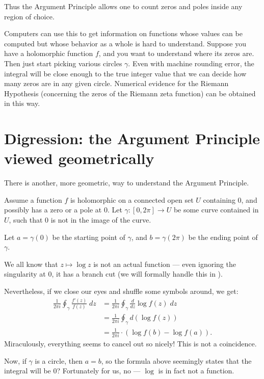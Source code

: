 Thus the Argument Principle allows one to count zeros and poles inside any region of choice.

Computers can use this to get information on functions whose values can be computed but whose behavior as a whole
is hard to understand.
Suppose you have a holomorphic function $f$, and you want to understand where its zeros are.
Then just start picking various circles $\gamma$.
Even with machine rounding error, the integral will be close enough to the true integer value that
we can decide how many zeros are in any given circle.
Numerical evidence for the Riemann Hypothesis (concerning the zeros of the Riemann zeta function)
can be obtained in this way.

\section{Digression: the Argument Principle viewed geometrically}

There is another, more geometric, way to understand the Argument Principle.

Assume a function $f$ is holomorphic on a connected open set $U$ containing $0$,
and possibly has a zero or a
pole at $0$. Let $\gamma \colon [0, 2 \pi] \to U$ be some curve contained in $U$, such that $0$ is
not in the image of the curve.

Let $a = \gamma(0)$ be the starting point of $\gamma$, and $b = \gamma(2 \pi)$ be the ending
point of $\gamma$.

We all know that $z \mapsto \log z$ is not an actual function --- even ignoring the singularity
at $0$, it has a branch cut (we will formally handle this in ).

Nevertheless, if we close our eyes and shuffle some symbols around, we get:
\begin{align*}
	\frac{1}{2 \pi i} \oint_\gamma \frac{f'(z)}{f(z)} \; dz
	&= \frac{1}{2 \pi i} \oint_\gamma \frac{d}{dz} \log f(z) \; dz \\
	&= \frac{1}{2 \pi i} \oint_\gamma d (\log f(z)) \\
	&= \frac{1}{2 \pi i} \cdot (\log f(b) - \log f(a)).
\end{align*}
Miraculously, everything seems to cancel out so nicely! This is not a coincidence.

Now, if $\gamma$ is a circle, then $a = b$, so the formula above seemingly states that the
integral will be $0$?
Fortunately for us, no --- $\log$ is in fact not a function.

